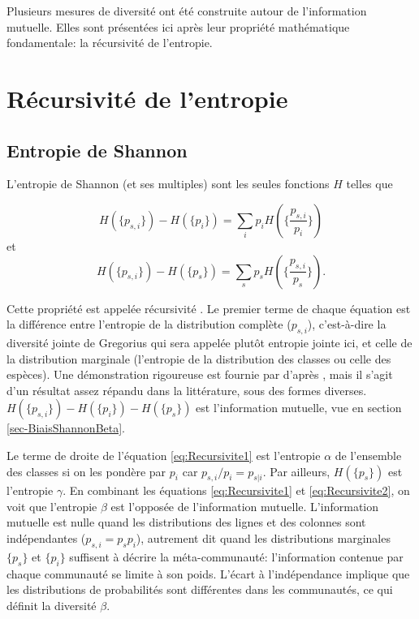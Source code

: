 \documentclass[
  11pt,
  french,
  a4paper,
  extrafontsizes,onecolumn,openright
  ]{memoir}
\begin{document}
\normalsize

Plusieurs mesures de diversité ont été construite autour de l'information mutuelle.
Elles sont présentées ici après leur propriété mathématique fondamentale: la récursivité de l'entropie.

\hypertarget{ruxe9cursivituxe9-de-lentropie}{%
\section{Récursivité de l'entropie}\label{ruxe9cursivituxe9-de-lentropie}}

\hypertarget{sec-jointeShannon}{%
\subsection{Entropie de Shannon}\label{sec-jointeShannon}}

L'entropie de Shannon (et ses multiples) sont les seules fonctions \(H\) telles que

\begin{equation}
  \label{eq:Recursivite1}
  H\left(\{p_{s,i}\}\right)-H\left(\{p_i\}\right) 
  = \sum_i{p_i H\left(\{\frac{p_{s,i}}{p_i}\}\right)}
\end{equation}
et
\begin{equation}
  \label{eq:Recursivite2}
  H\left(\{p_{s,i}\}\right)-H\left(\{p_s\}\right) 
  = \sum_s{p_s H\left(\{\frac{p_{s,i}}{p_s}\}\right)}.
\end{equation}

Cette propriété est appelée récursivité \autocite{Bacaro2013}.
Le premier terme de chaque équation est la différence entre l'entropie de la distribution complète (\(p_{s,i}\)), c'est-à-dire la diversité jointe de Gregorius qui sera appelée plutôt entropie jointe ici, et celle de la distribution marginale (l'entropie de la distribution des classes ou celle des espèces).
Une démonstration rigoureuse est fournie par \textcite{Baez2011} d'après \textcite{Faddeev1956}, mais il s'agit d'un résultat assez répandu dans la littérature, sous des formes diverses\autocite{Aczel1975,Renyi1961,Bourguignon1979}.
\(H(\{p_{s,i}\})-H(\{p_i\})-H(\{p_s\})\) est l'information mutuelle, vue en section \ref{sec-BiaisShannonBeta}.

Le terme de droite de l'équation \eqref{eq:Recursivite1} est l'entropie \(\alpha\) de l'ensemble des classes si on les pondère par \(p_i\) car \({p_{s,i}}/{p_i}=p_{s|i}\).
Par ailleurs, \(H(\{p_s\})\) est l'entropie \(\gamma\).
En combinant les équations \eqref{eq:Recursivite1} et \eqref{eq:Recursivite2}, on voit que l'entropie \(\beta\) est l'opposée de l'information mutuelle.
L'information mutuelle est nulle quand les distributions des lignes et des colonnes sont indépendantes (\(p_{s,i}=p_{s}p_{i}\)), autrement dit quand les distributions marginales \(\{p_s\}\) et \(\{p_i\}\) suffisent à décrire la méta-communauté: l'information contenue par chaque communauté se limite à son poids.
L'écart à l'indépendance implique que les distributions de probabilités sont différentes dans les communautés, ce qui définit la diversité \(\beta\).
\end{document}
